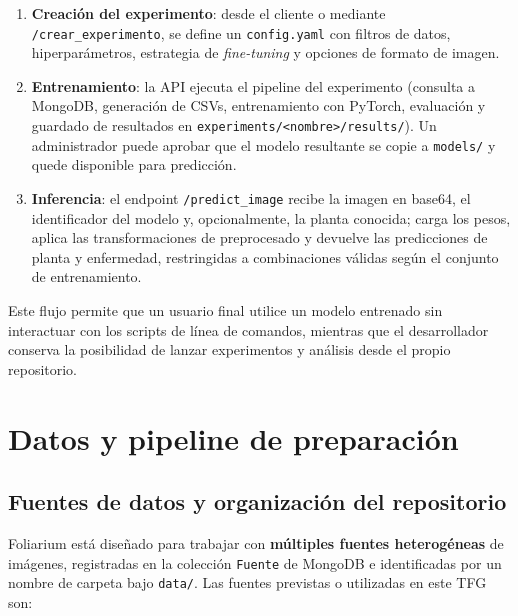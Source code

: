 \documentclass[11pt,spanish,listoffigures,listoftables]{tfgetsinf}
\begin{document}
\begin{enumerate}
    \item \textbf{Creación del experimento}: desde el cliente o mediante \texttt{/crear\_experimento}, se define un \texttt{config.yaml} con filtros de datos, hiperparámetros, estrategia de \textit{fine-tuning} y opciones de formato de imagen.
    \item \textbf{Entrenamiento}: la API ejecuta el pipeline del experimento (consulta a MongoDB, generación de CSVs, entrenamiento con PyTorch, evaluación y guardado de resultados en \texttt{experiments/<nombre>/results/}). Un administrador puede aprobar que el modelo resultante se copie a \texttt{models/} y quede disponible para predicción.
    \item \textbf{Inferencia}: el endpoint \texttt{/predict\_image} recibe la imagen en base64, el identificador del modelo y, opcionalmente, la planta conocida; carga los pesos, aplica las transformaciones de preprocesado y devuelve las predicciones de planta y enfermedad, restringidas a combinaciones válidas según el conjunto de entrenamiento.
\end{enumerate}

Este flujo permite que un usuario final utilice un modelo entrenado sin interactuar con los scripts de línea de comandos, mientras que el desarrollador conserva la posibilidad de lanzar experimentos y análisis desde el propio repositorio.

\chapter{Datos y pipeline de preparación}

\section{Fuentes de datos y organización del repositorio}

Foliarium está diseñado para trabajar con \textbf{múltiples fuentes heterogéneas} de imágenes, registradas en la colección \texttt{Fuente} de MongoDB e identificadas por un nombre de carpeta bajo \texttt{data/}. Las fuentes previstas o utilizadas en este TFG son:
\end{document}

